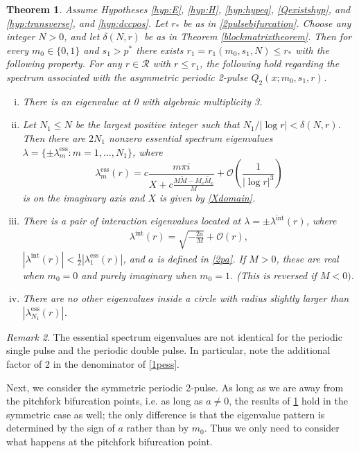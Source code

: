 \documentclass[10pt,reqno]{amsart}
\theoremstyle{plain}
\newtheorem{theorem}{Theorem}
\theoremstyle{definition}
\theoremstyle{remark}
\newtheorem{remark}[theorem]{Remark}
\numberwithin{theorem}{section}
\numberwithin{equation}{section}
\begin{document}
\begin{theorem}\label{theorem:2peigsassym}
Assume Hypotheses \ref{hyp:E}, \ref{hyp:H}, \ref{hyp:hypeq}, \ref{Qexistshyp}, and \ref{hyp:transverse}, and \ref{hyp:dccpos}. Let $r_*$ be as in \cref{2pulsebifurcation}. Choose any integer $N > 0$, and let $\delta(N,r)$ be as in Theorem \ref{blockmatrixtheorem}. Then for every $m_0 \in \{0, 1\}$ and $s_1 > p^*$ there exists $r_1 = r_1(m_0, s_1, N) \leq r_*$ with the following property. For any $r \in \mathcal{R}$ with $r \leq r_1$, the following hold regarding the spectrum associated with the asymmetric periodic 2-pulse $Q_2(x; m_0, s_1, r)$.

\begin{enumerate}[(i)]
\item There is an eigenvalue at 0 with algebraic multiplicity 3. 
\item Let $N_1 \leq N$ be the largest positive integer such that $N_1/|\log r| < \delta(N,r)$. Then there are $2N_1$ nonzero essential spectrum eigenvalues $\lambda = \{ \pm \lambda_m^{\text{ess}} : m = 1, \dots, N_1 \}$, where
\[
\lambda_m^{\text{ess}}(r) = c \frac{m \pi i}{X + c \frac{M\tilde{M} - M_c\tilde{M_c}}{M}} +  \mathcal{O}\left( \frac{1}{|\log r|^3} \right)
\]
is on the imaginary axis and $X$ is given by \cref{Xdomain}.

\item There is a pair of interaction eigenvalues located at $\lambda = \pm \lambda^{\text{int}}(r)$, where
	\begin{align*}
	\lambda^{\text{int}}(r) =  \sqrt{-\frac{2a}{M}} + \mathcal{O}\left( r \right),
	\end{align*}
$|\lambda^{\text{int}}(r)| < \frac{1}{2}|\lambda_1^{\text{ess}}(r)|$, and $a$ is defined in \cref{2pa}. If $M > 0$, these are real when $m_0 = 0$ and purely imaginary when $m_0 = 1$. (This is reversed if $M < 0)$. 
\item There are no other eigenvalues inside a circle with radius slightly larger than $|\lambda_{N_1}^{\text{ess}}(r)|$.
\end{enumerate}
\end{theorem}

\begin{remark}The essential spectrum eigenvalues are not identical for the periodic single pulse and the periodic double pulse. In particular, note the additional factor of 2 in the denominator of \cref{1pess}.
\end{remark}

Next, we consider the symmetric periodic 2-pulse. As long as we are away from the pitchfork bifurcation points, i.e. as long as $a \neq 0$, the results of \cref{theorem:2peigsassym} hold in the symmetric case as well; the only difference is that the eigenvalue pattern is determined by the sign of $a$ rather than by $m_0$. Thus we only need to consider what happens at the pitchfork bifurcation point.
\end{document}
